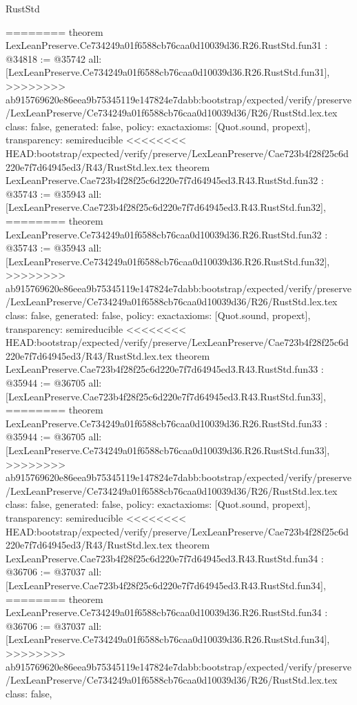 \begin{lexlean}{RustStd}
\begin{coremodule}
{\begin{coremodule}
{{{{{{{{{{{{{{{{{{{{{{{{{{{{{{{{{{========
theorem LexLeanPreserve.Ce734249a01f6588cb76caa0d10039d36.R26.RustStd.fun31 : @34818 := @35742 {
  all: [LexLeanPreserve.Ce734249a01f6588cb76caa0d10039d36.R26.RustStd.fun31],
>>>>>>>> ab915769620e86eea9b75345119e147824e7dabb:bootstrap/expected/verify/preserve/LexLeanPreserve/Ce734249a01f6588cb76caa0d10039d36/R26/RustStd.lex.tex
  class: false,
  generated: false,
  policy: exact{axioms: [Quot.sound, propext]},
  transparency: semireducible
}
<<<<<<<< HEAD:bootstrap/expected/verify/preserve/LexLeanPreserve/Cae723b4f28f25c6d220e7f7d64945ed3/R43/RustStd.lex.tex
theorem LexLeanPreserve.Cae723b4f28f25c6d220e7f7d64945ed3.R43.RustStd.fun32 : @35743 := @35943 {
  all: [LexLeanPreserve.Cae723b4f28f25c6d220e7f7d64945ed3.R43.RustStd.fun32],
========
theorem LexLeanPreserve.Ce734249a01f6588cb76caa0d10039d36.R26.RustStd.fun32 : @35743 := @35943 {
  all: [LexLeanPreserve.Ce734249a01f6588cb76caa0d10039d36.R26.RustStd.fun32],
>>>>>>>> ab915769620e86eea9b75345119e147824e7dabb:bootstrap/expected/verify/preserve/LexLeanPreserve/Ce734249a01f6588cb76caa0d10039d36/R26/RustStd.lex.tex
  class: false,
  generated: false,
  policy: exact{axioms: [Quot.sound, propext]},
  transparency: semireducible
}
<<<<<<<< HEAD:bootstrap/expected/verify/preserve/LexLeanPreserve/Cae723b4f28f25c6d220e7f7d64945ed3/R43/RustStd.lex.tex
theorem LexLeanPreserve.Cae723b4f28f25c6d220e7f7d64945ed3.R43.RustStd.fun33 : @35944 := @36705 {
  all: [LexLeanPreserve.Cae723b4f28f25c6d220e7f7d64945ed3.R43.RustStd.fun33],
========
theorem LexLeanPreserve.Ce734249a01f6588cb76caa0d10039d36.R26.RustStd.fun33 : @35944 := @36705 {
  all: [LexLeanPreserve.Ce734249a01f6588cb76caa0d10039d36.R26.RustStd.fun33],
>>>>>>>> ab915769620e86eea9b75345119e147824e7dabb:bootstrap/expected/verify/preserve/LexLeanPreserve/Ce734249a01f6588cb76caa0d10039d36/R26/RustStd.lex.tex
  class: false,
  generated: false,
  policy: exact{axioms: [Quot.sound, propext]},
  transparency: semireducible
}
<<<<<<<< HEAD:bootstrap/expected/verify/preserve/LexLeanPreserve/Cae723b4f28f25c6d220e7f7d64945ed3/R43/RustStd.lex.tex
theorem LexLeanPreserve.Cae723b4f28f25c6d220e7f7d64945ed3.R43.RustStd.fun34 : @36706 := @37037 {
  all: [LexLeanPreserve.Cae723b4f28f25c6d220e7f7d64945ed3.R43.RustStd.fun34],
========
theorem LexLeanPreserve.Ce734249a01f6588cb76caa0d10039d36.R26.RustStd.fun34 : @36706 := @37037 {
  all: [LexLeanPreserve.Ce734249a01f6588cb76caa0d10039d36.R26.RustStd.fun34],
>>>>>>>> ab915769620e86eea9b75345119e147824e7dabb:bootstrap/expected/verify/preserve/LexLeanPreserve/Ce734249a01f6588cb76caa0d10039d36/R26/RustStd.lex.tex
  class: false,
}}}}}}}}}}}}}}}}}}}}}}}}}}}}}}}}}}}}}}
\end{coremodule}}
\end{coremodule}
\end{lexlean}
